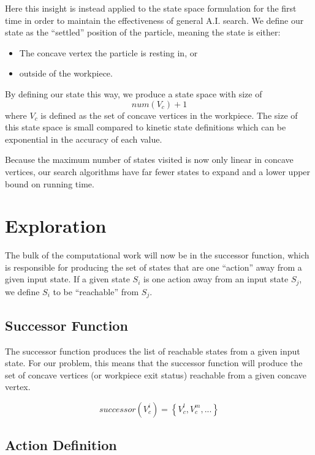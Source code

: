 Here this insight is instead applied to the state space formulation for the first time in order to maintain the effectiveness of general A.I. search. We define our state as the ``settled'' position of the particle, meaning the state is either:

\begin{itemize}
\item The concave vertex the particle is resting in, or
\item outside of the workpiece.
\end{itemize}

By defining our state this way, we produce a state space with size of
$$
num(V_{c}) + 1
$$
where $V_{c}$ is defined as the set of concave vertices in the workpiece. The size of this state space is small compared to kinetic state definitions which can be exponential in the accuracy of each value.

Because the maximum number of states visited is now only linear in concave vertices, our search algorithms have far fewer states to expand and a lower upper bound on running time.

\section{Exploration}

The bulk of the computational work will now be in the successor function, which is responsible for producing the set of states that are one ``action'' away from a given input state. If a given state $S_i$ is one action away from an input state $S_j$, we define $S_i$ to be ``reachable'' from $S_j$.

	\subsection{Successor Function}

The successor function produces the list of reachable states from a given input state. For our problem, this means that the successor function will produce the set of concave vertices (or workpiece exit status) reachable from a given concave vertex.

$$
successor(V_{c}^{i}) = \left \{ V_{c}^{l}, V_{c}^{m}, ...  \right \}
$$

	\subsection{Action Definition}

